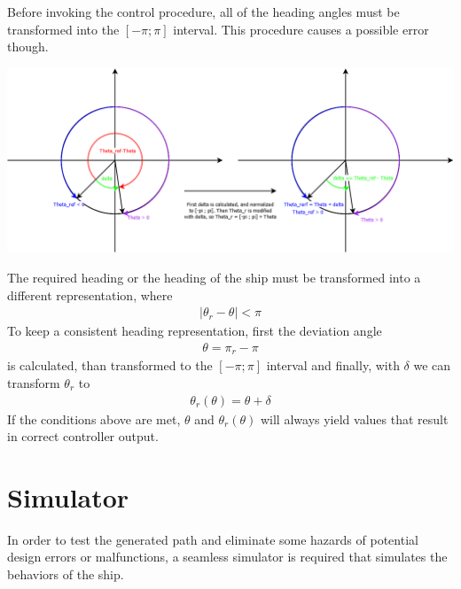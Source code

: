 Before invoking the control procedure, all of the heading angles must be transformed into the $[-\pi ; \pi]$ interval.
This procedure causes a possible error though.

\includegraphics[width=\textwidth]{img/Headings}

The required heading or the heading of the ship must be transformed into a different representation, where 
\begin{align}
|\theta_{r}-\theta| < \pi
\end{align}
To keep a consistent heading representation, first the deviation angle 
\begin{align}
\theta = \pi_{r}-\pi
\end{align} is calculated, than transformed to the $[-\pi;\pi]$ interval and finally, with $\delta$ we can transform $\theta_{r}$ to 
\begin{align}
\theta_{r}(\theta) = \theta + \delta
\end{align}
If the conditions above are met, $\theta$ and $\theta_r(\theta)$ will always yield values that result in correct controller output.

\section{Simulator}
In order to test the generated path and eliminate some hazards of potential design errors or malfunctions, a seamless simulator is required that simulates the behaviors of the ship. \\


